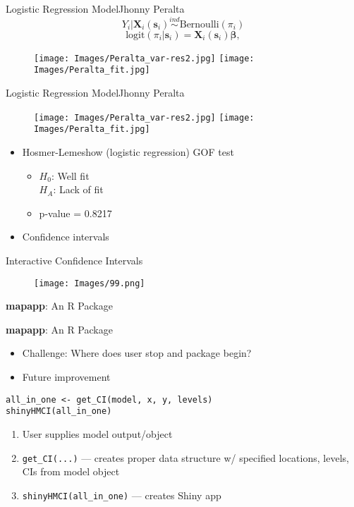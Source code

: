 \documentclass{beamer}
\begin{document}
\begin{frame}{Logistic Regression Model}{Jhonny Peralta} %
$$Y_{i}|\mathbf{X}_{i}(\mathbf{s}_{i}) \stackrel{ind}{\sim} \mbox{Bernoulli}(\pi_{i}) $$
$$ \text{logit}(\pi_{i}|\pmb{s}_{i}) = \mathbf{X}_{i}(\mathbf{s}_{i})\pmb{\beta}, $$
  \begin{figure}[H]
	\centering
	\texttt{[image: Images/Peralta\_var-res2.jpg]}
	\texttt{[image: Images/Peralta\_fit.jpg]}
	\end{figure}
\end{frame}

\begin{frame}{Logistic Regression Model}{Jhonny Peralta} %
  \begin{figure}[H]
	\centering
	\texttt{[image: Images/Peralta\_var-res2.jpg]}
	\texttt{[image: Images/Peralta\_fit.jpg]}
	\end{figure}
\begin{itemize}
\addtolength{\itemsep}{0.5\baselineskip}
\item Hosmer-Lemeshow (logistic regression) GOF test
  \begin{itemize}
  \addtolength{\itemsep}{0.5\baselineskip}
  \item $H_0$: Well fit \\ $H_A$: Lack of fit
  \item p-value = 0.8217
  \end{itemize}
\item Confidence intervals
\end{itemize}
\end{frame}

\begin{frame}{Interactive Confidence Intervals}{} %
  \begin{figure}[H]
	\centering
	\texttt{[image: Images/99.png]}
	\end{figure}
{\bf mapapp}: An R Package
\end{frame}

\begin{frame}[fragile]{{\bf mapapp}: An R Package}
\begin{itemize}
\addtolength{\itemsep}{0.5\baselineskip}
\item Challenge: Where does user stop and package begin?
\item Future improvement
\end{itemize}

\begin{verbatim}
all_in_one <- get_CI(model, x, y, levels)
shinyHMCI(all_in_one)
\end{verbatim}

\begin{enumerate}
\addtolength{\itemsep}{0.5\baselineskip}
\item User supplies model output/object
\item \verb|get_CI(...)| --- creates proper data structure w/ specified locations, levels, CIs from model object
\item \verb|shinyHMCI(all_in_one)| --- creates Shiny app
\end{enumerate}

\end{frame}
\end{document}

